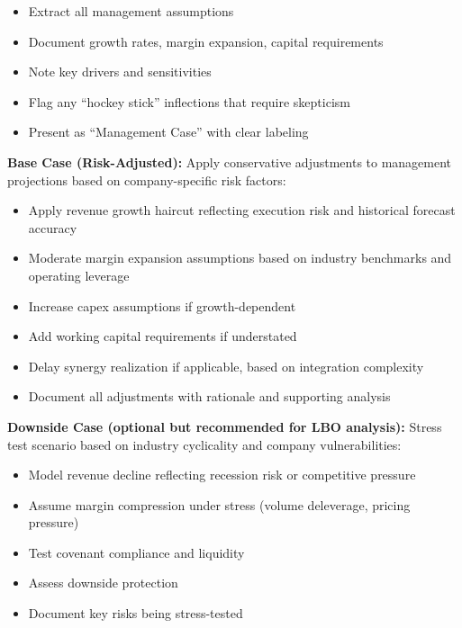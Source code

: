 \documentclass[11pt]{article}
\begin{document}
\begin{itemize}[leftmargin=*,itemsep=2pt,topsep=2pt]
\item {} Extract all management assumptions
\item {} Document growth rates, margin expansion, capital requirements
\item {} Note key drivers and sensitivities
\item {} Flag any ``hockey stick'' inflections that require skepticism
\item {} Present as ``Management Case'' with clear labeling
\end{itemize}

\textbf{Base Case (Risk-Adjusted):} Apply conservative adjustments to management projections based on company-specific risk factors:

\begin{itemize}[leftmargin=*,itemsep=2pt,topsep=2pt]
\item {} Apply revenue growth haircut reflecting execution risk and historical forecast accuracy
\item {} Moderate margin expansion assumptions based on industry benchmarks and operating leverage
\item {} Increase capex assumptions if growth-dependent
\item {} Add working capital requirements if understated
\item {} Delay synergy realization if applicable, based on integration complexity
\item {} Document all adjustments with rationale and supporting analysis
\end{itemize}

\textbf{Downside Case (optional but recommended for LBO analysis):} Stress test scenario based on industry cyclicality and company vulnerabilities:

\begin{itemize}[leftmargin=*,itemsep=2pt,topsep=2pt]
\item {} Model revenue decline reflecting recession risk or competitive pressure
\item {} Assume margin compression under stress (volume deleverage, pricing pressure)
\item {} Test covenant compliance and liquidity
\item {} Assess downside protection
\item {} Document key risks being stress-tested
\end{itemize}
\end{document}
